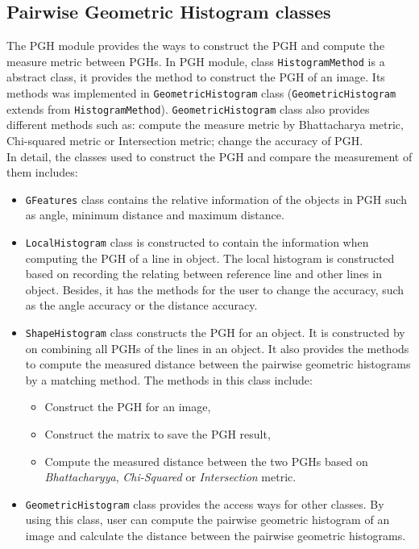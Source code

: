 \subsection{Pairwise Geometric Histogram classes}
The PGH module provides the ways to construct the PGH and compute the measure metric between PGHs. In PGH module, class \texttt{HistogramMethod} is a abstract class, it provides the method to construct the PGH of an image. Its methods was implemented in \texttt{GeometricHistogram} class (\texttt{GeometricHistogram} extends from \texttt{HistogramMethod}). \texttt{GeometricHistogram} class also provides different methods such as: compute the measure metric by Bhattacharya metric, Chi-squared metric or Intersection metric; change the accuracy of PGH.\\
In detail, the classes used to construct the PGH and compare the measurement of them includes:
\begin{itemize}
\item \texttt{GFeatures} class contains the relative information of the objects in PGH such as angle, minimum distance and maximum distance.
\item \texttt{LocalHistogram} class is constructed to contain the information when computing the PGH of a line in object. The local histogram is constructed based on recording the relating between reference line and other lines in object. Besides, it has the methods for the user to change the accuracy, such as the angle accuracy or the distance accuracy.
\item \texttt{ShapeHistogram} class constructs the PGH for an object. It is constructed by on combining all PGHs of the lines in an object. It also provides the methods to compute the measured distance between the pairwise geometric histograms by a matching method. The methods in this class include:
\begin{itemize}
\item Construct the PGH for an image,
\item Construct the matrix to save the PGH result,
\item Compute the measured distance between the two PGHs based on \textit{Bhattacharyya}, \textit{Chi-Squared} or \textit{Intersection} metric.
\end{itemize}
\item \texttt{GeometricHistogram} class provides the access ways for other classes. By using this class, user can compute the pairwise geometric histogram of an image and calculate the distance between the pairwise geometric histograms.
\end{itemize}
